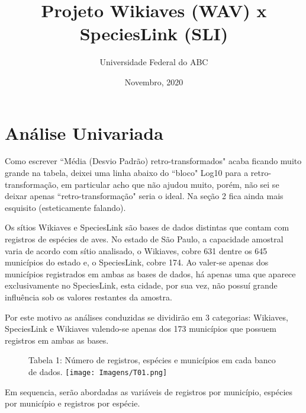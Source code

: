 \documentclass[12pt]{extarticle}
\title{Projeto Wikiaves (WAV) x SpeciesLink (SLI)}
\author{Universidade Federal do ABC}
\date{Novembro, 2020}
\newcommand{\asp}[1]{``#1"}
\newenvironment{resposta}{ \color{mygray}}{}
\begin{document}
\maketitle


\section{Análise Univariada}

\hrulefill

Como escrever \asp{Média (Desvio Padrão) retro-transformados} acaba ficando muito grande na tabela, deixei uma linha abaixo do \asp{bloco} Log10 para a retro-transformação, em particular acho que não ajudou muito, porém, não sei se deixar apenas \asp{retro-transformação} seria o ideal. Na seção 2 fica ainda mais esquisito (esteticamente falando).

\hrulefill


\begin{resposta}
Os sítios Wikiaves e SpeciesLink são bases de dados distintas que contam com registros de espécies de aves. No estado de São Paulo, a capacidade amostral varia de acordo com sítio analisado, o Wikiaves, cobre 631 dentre os 645 municípios do estado e, o SpeciesLink, cobre 174. Ao valer-se apenas dos municípios registrados em ambas as bases de dados, há apenas uma que aparece exclusivamente no SpeciesLink, esta cidade, por sua vez, não possuí grande influência sob os valores restantes da amostra. 

Por este motivo as análises conduzidas se dividirão em 3 categorias: Wikiaves, SpeciesLink e Wikiaves valendo-se apenas dos 173 municípios que possuem registros em ambas as bases.

\end{resposta}

\begin{figure}[h!]
\centering
{\scriptsize Tabela 1: Número de registros, espécies e municípios em cada banco de dados.}
\texttt{[image: Imagens/T01.png]}
\end{figure}

\begin{resposta}
Em sequencia, serão abordadas as variáveis de registros por município, espécies por município e registros por espécie.
\end{resposta}
\end{document}
